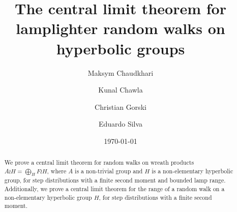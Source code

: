 \documentclass[reqno,oneside,11pt]{amsart}
\author{Maksym Chaudkhari}
\author{Kunal Chawla}
\author{Christian Gorski}
\author{Eduardo Silva}
\title[CLT for lamplighter random walks on hyperbolic groups]{The central limit theorem for lamplighter random walks on hyperbolic groups}
\date{\today}
\begin{document}
	
	\maketitle
	\begin{abstract} 
We prove a central limit theorem for random walks on wreath products $A\wr H=\bigoplus_H F\wr H $, where $A$ is a non-trivial group and $H$ is a non-elementary hyperbolic group, for step distributions with a finite second moment and bounded lamp range. Additionally, we prove a central limit theorem for the range of a random walk on a non-elementary hyperbolic group $H$, for step distributions with a finite second moment.
	\end{abstract}






\end{document}

